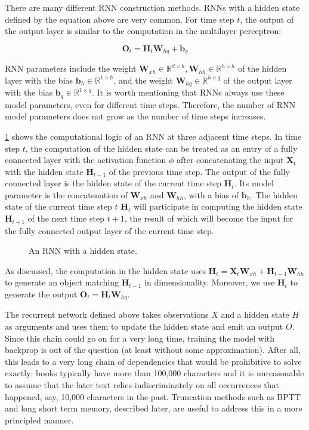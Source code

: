 There are many different RNN construction methods.  RNNs with a hidden state defined by the equation above are very common. For time step $t$, the output of the output layer is similar to the computation in the multilayer perceptron:

$$\mathbf{O}_t = \mathbf{H}_t \mathbf{W}_{hq} + \mathbf{b}_q$$

RNN parameters include the weight $\mathbf{W}_{xh} \in \mathbb{R}^{d \times h}, \mathbf{W}_{hh} \in \mathbb{R}^{h \times h}$ of the hidden layer with the bias $\mathbf{b}_h \in \mathbb{R}^{1 \times h}$, and the weight $\mathbf{W}_{hq} \in \mathbb{R}^{h \times q}$ of the output layer with the bias $\mathbf{b}_q \in \mathbb{R}^{1 \times q}$. It is worth mentioning that RNNs always use these model parameters, even for different time steps. Therefore, the number of RNN model parameters does not grow as the number of time steps increases.

\cref{fig:rnn} shows the computational logic of an RNN at three adjacent time steps. In time step $t$, the computation of the hidden state can be treated as an entry of a fully connected layer with the activation function $\phi$ after concatenating the input $\mathbf{X}_t$ with the hidden state $\mathbf{H}_{t-1}$ of the previous time step.  The output of the fully connected layer is the hidden state of the current time step $\mathbf{H}_t$. Its model parameter is the concatenation of $\mathbf{W}_{xh}$ and $\mathbf{W}_{hh}$, with a bias of $\mathbf{b}_h$. The hidden state of the current time step $t$ $\mathbf{H}_t$ will participate in computing the hidden state $\mathbf{H}_{t+1}$ of the next time step $t+1$, the result of which will become the input for the fully connected output layer of the current time step.

\begin{figure}[hpt]
	\centering
	
	\caption{An RNN with a hidden state.}
	\label{fig:rnn}
\end{figure}

As discussed, the computation in the hidden state uses $\mathbf{H}_t = \mathbf{X}_t \mathbf{W}_{xh} + \mathbf{H}_{t-1} \mathbf{W}_{hh}$ to generate an object matching $\mathbf{H}_{t-1}$ in dimensionality. Moreover, we use $\mathbf{H}_t$ to generate the output $\mathbf{O}_t = \mathbf{H}_t \mathbf{W}_{hq}$.

The recurrent network defined above takes observations $X$ and a hidden state $H$ as arguments and uses them to update the hidden state and emit an output $O$. Since this chain could go on for a very long time, training the model with backprop is out of the question (at least without some approximation). After all, this leads to a very long chain of dependencies that would be prohibitive to solve exactly: books typically have more than 100,000 characters and it is unreasonable to assume that the later text relies indiscriminately on all occurrences that happened, say, 10,000 characters in the past. Truncation methods such as BPTT and long short term memory, described later, are useful to address this in a more principled manner. 

